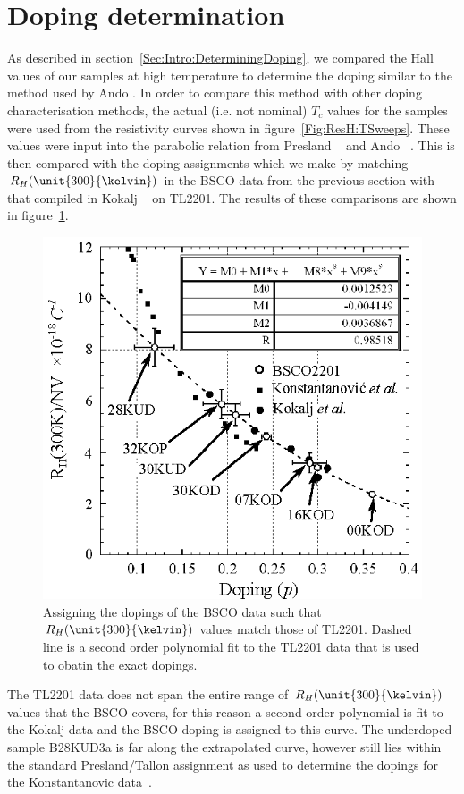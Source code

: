
\section{Doping determination}
    \label{Sec:ResH:DopingDetermination}

As described in section~\ref{Sec:Intro:DeterminingDoping}, we compared the Hall values of our samples at high temperature to determine the doping similar to the method used by Ando \etal\cite{Ando2000}. In order to compare this method with other doping characterisation methods, the actual (i.e. not nominal) $T_c$ values for the samples were used from the resistivity curves shown in figure~\ref{Fig:ResH:TSweeps}. These values were input into the parabolic relation from Presland \etal~\cite{Presland1991} and Ando \etal~\cite{Ando2000}. This is then compared with the doping assignments which we make by matching $R_H(\unit{300}{\kelvin})$ in the \ac{BSCO} data from the previous section with that compiled in Kokalj \etal~\cite{Kokalj2012} on \ac{TL2201}. The results of these comparisons are shown in figure~\ref{Fig:ResH:DopingRh300}.
\begin{figure}[htbp]
    \begin{center}
        \includegraphics[scale=1.1]{Chapter-HallBSCO/Figures/DopingRh300/DopingRh300}
        \caption{Assigning the dopings of the \ac{BSCO} data such that $R_H(\unit{300}{\kelvin})$ values match those of \ac{TL2201}. Dashed line is a second order polynomial fit to the \ac{TL2201} data that is used to obatin the exact dopings.}
        \label{Fig:ResH:DopingRh300}
    \end{center}
\end{figure}
The \ac{TL2201} data does not span the entire range of $R_H(\unit{300}{\kelvin})$ values that the \ac{BSCO} covers, for this reason a second order polynomial is fit to the Kokalj data and the \ac{BSCO} doping is assigned to this curve. The underdoped sample B28KUD3a is far along the extrapolated curve, however still lies within the standard Presland/Tallon assignment as used to determine the dopings for the Konstantanovic data~\cite{Konstantinovic2001}.

